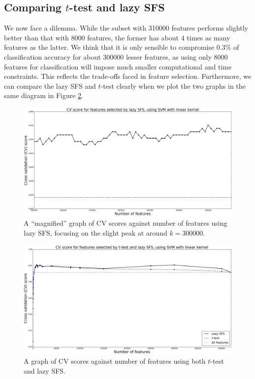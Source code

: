 \documentclass[12pt, twoside, a4paper]{report}
\begin{document}
\subsection{Comparing $t$-test and lazy SFS}
We now face a dilemma. While the subset with 310000 features performs slightly better than that with 8000 features, the former has about 4 times as many features as the latter. We think that it is only sensible to compromise 0.3\% of classification accuracy for about 300000 lesser features, as using only 8000 features for classification will impose much smaller computational and time constraints. This reflects the trade-offs faced in feature selection. Furthermore, we can compare the lazy SFS and $t$-test clearly when we plot the two graphs in the same diagram in Figure \ref{body:t_test_and_lazy_sfs:graph}.

\begin{figure}
\centering
\includegraphics[width=\textwidth]{images/lazy_sfs_smaller_range.jpeg}
\caption{A ``magnified'' graph of CV scores against number of features using lazy SFS, focusing on the slight peak at around $k=300000$.}
\label{body:lazy_sfs_smaller_range:graph}
\end{figure}



\begin{figure}
\centering
\includegraphics[width=\textwidth]{images/t_test_and_lazy_sfs.jpeg}
\caption{A graph of CV scores against number of features using both $t$-test and lazy SFS.}
\label{body:t_test_and_lazy_sfs:graph}
\end{figure}
\end{document}
